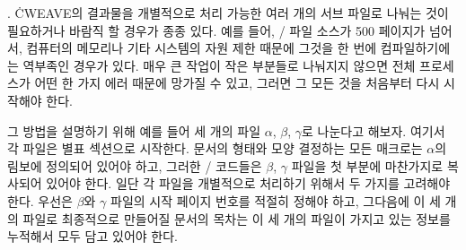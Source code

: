 {%
. \.{CWEAVE}의 결과물을 개별적으로 처리 가능한 여러 개의 서브 파일로
나눠는 것이 필요하거나 바람직 할 경우가 종종 있다. 예를 들어, \TEX/ 파일 소스가
500 페이지가 넘어서, 컴퓨터의 메모리나 기타 시스템의 자원 제한 때문에 그것을
한 번에 컴파일하기에는 역부족인 경우가 있다. 매우 큰 작업이 작은 부분들로
나눠지지 않으면 전체 프로세스가 어떤 한 가지 에러 때문에 망가질 수 있고, 그러면
그 모든 것을 처음부터 다시 시작해야 한다.

그 방법을 설명하기 위해 예를 들어 세 개의 파일 $\alpha$, $\beta$, $\gamma$로
나눈다고 해보자. 여기서 각 파일은 별표 섹션으로 시작한다. 문서의 형태와 모양
결정하는 모든 매크로는 $\alpha$의 림보에 정의되어 있어야 하고, 그러한 \TEX/
코드들은 $\beta$, $\gamma$ 파일을 첫 부분에 마찬가지로 복사되어 있어야 한다.
일단 각 파일을 개별적으로 처리하기 위해서 두 가지를 고려해야 한다. 우선은
$\beta$와 $\gamma$ 파일의 시작 페이지 번호를 적절히 정해야 하고, 그다음에 이
세 개의 파일로 최종적으로 만들어질 문서의 목차는 이 세 개의 파일이 가지고 있는
정보를 누적해서 모두 담고 있어야 한다.

}
